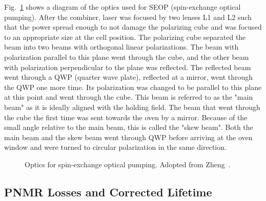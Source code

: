 Fig.~\ref{optics} shows a diagram of the optics used for SEOP (spin-exchange optical pumping). After the combiner, laser was focused by two lenses L1 and L2 such that the power spread enough to not damage the polarizing cube and was focused to an appropriate size at the cell position. The polarizing cube separated the beam into two beams with orthogonal linear polarizations. The beam with polarization parallel to this plane went through the cube, and the other beam with polarization perpendicular to the plane was reflected. The reflected beam went through a QWP (quarter wave plate), reflected at a mirror, went through the QWP one more time. Its polarization was changed to be parallel to this plane at this point and went through the cube. This beam is referred to as the "main beam" as it is ideally aligned with the holding field. The beam that went through the cube the first time was sent towards the oven by a mirror. Because of the small angle relative to the main beam, this is called the "skew beam". Both the main beam and the skew beam went through QWP before arriving at the oven window and were turned to circular polarization in the same direction.

\begin{figure}[t!]
	\centering
	\caption{{Optics for spin-exchange optical pumping. Adopted from Zheng~\cite{YuanThesis}.}}
	\label{optics}
\end{figure}

\subsection{PNMR Losses and Corrected Lifetime}

